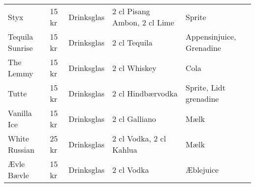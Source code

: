 \begin{tabular}{lllll}
\rowcolor{Gray}%
Styx & 15 kr & Drinksglas & 2 cl   Pisang Ambon, 2 cl   Lime & Sprite\\
Tequila Sunrise & 15 kr & Drinksglas & 2 cl   Tequila & Appensinjuice, Grenadine\\
\rowcolor{Gray}%
The Lemmy & 15 kr & Drinksglas & 2 cl   Whiskey & Cola\\
Tutte & 15 kr & Drinksglas & 2 cl   Hindbærvodka & Sprite, Lidt grenadine\\
\rowcolor{Gray}%
Vanilla Ice & 15 kr & Drinksglas & 2 cl   Galliano & Mælk\\
White Russian & 25 kr & Drinksglas & 2 cl   Vodka, 2 cl   Kahlua & Mælk\\
\rowcolor{Gray}%
Ævle Bævle & 15 kr & Drinksglas & 2 cl   Vodka & Æblejuice\\
\bottomrule
\end{tabular}
